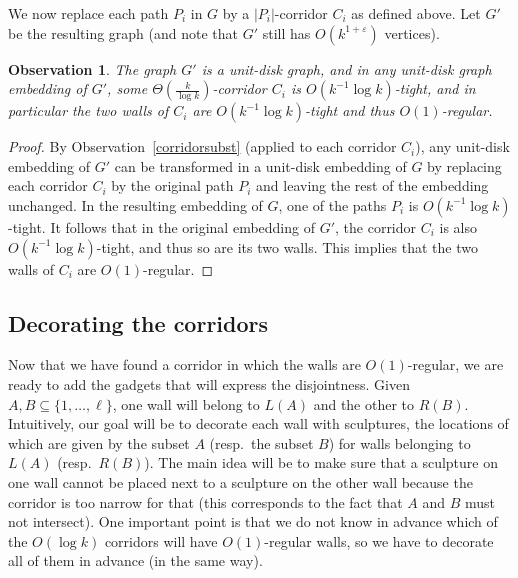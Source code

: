 \documentclass[a4paper,reqno, 12pt]{amsart}
\newtheorem{observation}[theorem]{Observation}
\begin{document}
  We now replace each path $P_i$ in $G$ by a $|P_i|$-corridor $C_i$ as defined
  above. Let $G'$ be the resulting graph (and note that $G'$ still has
  $O(k^{1+\varepsilon})$ vertices).

  \begin{observation}\label{corridorsubst2}
The graph $G'$ is a unit-disk graph, and in any unit-disk graph embedding of
$G'$, some $\Theta\left (\tfrac{k}{\log k} \right )$-corridor $C_i$  is
$O(k^{-1}\log k)$-tight, and in particular the two walls of $C_i$ are
$O(k^{-1}\log k)$-tight and thus $O(1)$-regular.
\end{observation}

\begin{proof}
By Observation~\ref{corridorsubst} (applied to each corridor $C_i$),
any unit-disk embedding of $G'$ can be transformed in a unit-disk
embedding of $G$ by replacing each corridor $C_i$ by the original path
$P_i $ and leaving the rest of the embedding unchanged. In the
resulting embedding of $G$, one of the paths $P_i$ is $O(k^{-1}\log
k)$-tight. It follows that in the original embedding of $G'$, the
corridor $C_i$ is also $O(k^{-1}\log
k)$-tight, and thus so are its two walls. This implies that the two
walls of $C_i$  are $O(1)$-regular. 
\end{proof}

\subsection{Decorating the corridors}

Now that we have found a corridor in which the walls are
$O(1)$-regular, we are ready to add the gadgets that will express the disjointness. Given $A,B\subseteq \{1,\ldots,\ell\}$, one wall will belong to $L(A)$
and the other to $R(B)$.
Intuitively, our goal will be to decorate each 
wall with sculptures, the locations of which are given by the subset $A$ (resp.\ the subset $B$)
for walls belonging to $L(A)$ (resp.~$R(B)$).
The main
idea will be to make sure that a sculpture on one wall cannot be
placed next to a sculpture on the other wall because the corridor is too
narrow for that (this corresponds to the fact that $A$ and $B$ must not intersect). One important point is
that we do not know in advance which of the $O(\log k)$ corridors will
have $O(1)$-regular walls, so we have to decorate all of them in
advance (in the same way).

\medskip
\end{document}
